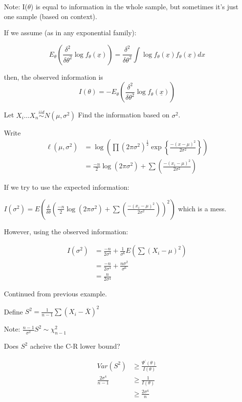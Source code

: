\documentclass[11pt,fleqn]{book} %
\begin{document}
	Note: I($\theta$) is equal to information in the whole sample, but sometimes it's just one sample (based on context).

	If we assume (as in any exponential family):

	$$E_\theta \left(\frac{\delta^2}{\delta \theta^2}\log f_\theta(\underline{x})\right) = \frac{\delta^2}{\delta \theta^2}\int{\log f_{\theta}(\underline{x})}f_\theta(\underline{x})dx$$
	  
	then, the observed information is 
	$$I(\theta) = - E_\theta \left(\frac{\delta^2}{\delta \theta^2}\log f_\theta(\underline{x})\right) $$

	\begin{example}
		Let $X_i \dots X_n \stackrel{iid}{\sim} N(\mu,\sigma^2)$
	Find the information based on $\sigma^2$.

		Write 
	\begin{align*}
		\ell(\mu,\sigma^2) &=\log\left(\prod (2\pi\sigma^2)^{\frac{1}{2}} \exp\left\{\frac{-(x-\mu)^2}{2\sigma^2}\right\}\right)\\
		&= \frac{-n}{2} \log(2\pi\sigma^2) +\sum \left(\frac{-(x_i-\mu)^2}{2\sigma^2} \right)
		\end{align*}

	If we try to use the expected information: 

	$I(\sigma^2) = E\left(\frac{\delta}{\delta \theta}\left(\frac{-n}{2} \log(2\pi\sigma^2) +\sum \left(\frac{-(x_i-\mu)^2}{2\sigma^2}\right)\right)^2 \right)$
	which is a mess. 

	However, using the observed information:

	\begin{align*}
	I(\sigma^2) &= \frac{-n}{2\sigma^4} + \frac{1}{\sigma^6} E\left(\sum(X_i-\mu)^2\right)\\
		&= \frac{-n}{2\sigma^4}+\frac{n\sigma^2}{\sigma^6}\\
		&= \frac{n}{2\sigma^4}
	\end{align*}

	\end{example}

	\begin{example}
		Continued from previous example. 

		Define $S^2 = \frac{1}{n-1}\sum (X_i - \bar{X})^2$

		Note: $\frac{n-1}{\sigma^2}S^2 \sim \chi^2_{n-1}$

		Does $S^2$ acheive the C-R lower bound?

		\begin{align*}
		Var(S^2) &\ge \frac{\Psi^\prime(\theta)}{I(\theta)}\\
			\frac{2\sigma^4}{n-1} &\ge \frac{1}{I(\theta)}\\
			&\ge \frac{2\sigma^4}{n}
		\end{align*}
	\end{example}
\end{document}
